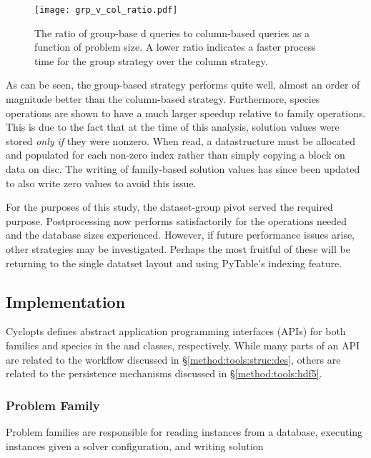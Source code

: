 \begin{figure}
  \begin{center}
    \texttt{[image: grp\_v\_col\_ratio.pdf]}
    \caption[]{
      \label{fig:col_grp}
      The ratio of group-base d queries to column-based queries as a function of
      problem size. A lower ratio indicates a faster process time for the group
      strategy over the column strategy.}
  \end{center}
\end{figure}

As can be seen, the group-based strategy performs quite well, almost an order of
magnitude better than the column-based strategy. Furthermore, species operations
are shown to have a much larger speedup relative to family operations. This is
due to the fact that at the time of this analysis, solution values were stored
\textit{only if} they were nonzero. When read, a datastructure must be allocated
and populated for each non-zero index rather than simply copying a block on data
on disc. The writing of family-based solution values has since been updated to
also write zero values to avoid this issue.

For the purposes of this study, the dataset-group pivot served the required
purpose. Postprocessing now performs satisfactorily for the operations needed
and the database sizes experienced. However, if future performance issues arise,
other strategies may be investigated. Perhaps the most fruitful of these will be
returning to the single datatset layout and using PyTable's indexing feature. 

\subsection{Implementation}

Cyclopts defines abstract application programming interfaces (APIs) for both
families and species in the  and 
classes, respectively. While many parts of an API are related to the workflow
discussed in \S \ref{method:tools:struc:des}, others are related to the
persistence mechanisms discussed in \S \ref{method:tools:hdf5}.

\subsubsection{Problem Family}

Problem families are responsible for reading instances from a database, executing instances given a solver configuration, and writing solution 

